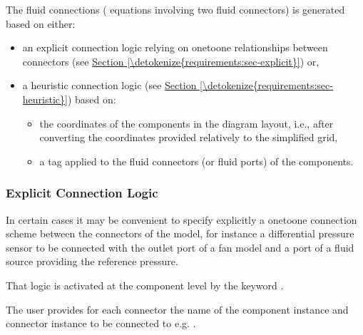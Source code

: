 \documentclass[letterpaper,10pt, openany,english]{sphinxmanual}
\begin{document}
The fluid connections ( equations involving two fluid connectors) is generated based on either:
\begin{itemize}
\item {} 
an explicit connection logic relying on one\sphinxhyphen{}to\sphinxhyphen{}one relationships between connectors (see \hyperref[\detokenize{requirements:sec-explicit}]{Section \ref{\detokenize{requirements:sec-explicit}}}) or,

\item {} 
a heuristic connection logic (see \hyperref[\detokenize{requirements:sec-heuristic}]{Section \ref{\detokenize{requirements:sec-heuristic}}}) based on:
\begin{itemize}
\item {} 
the coordinates of the components in the diagram layout, i.e., after converting the coordinates provided relatively to the simplified grid,

\item {} 
a tag applied to the fluid connectors (or fluid ports) of the components.

\end{itemize}

\end{itemize}


\subsubsection{Explicit Connection Logic}
\label{\detokenize{requirements:explicit-connection-logic}}\label{\detokenize{requirements:sec-explicit}}
In certain cases it may be convenient to specify explicitly a one\sphinxhyphen{}to\sphinxhyphen{}one connection scheme between the connectors of the model, for instance a differential pressure sensor to be connected with the outlet port of a fan model and a port of a fluid source providing the reference pressure.

That logic is activated at the component level by the keyword .

The user provides for each connector the name of the component instance and connector instance to be connected to e.g. .
\end{document}
